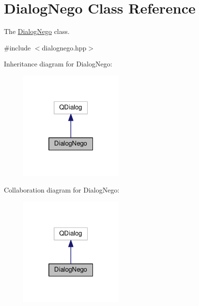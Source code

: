 \hypertarget{classDialogNego}{}\section{Dialog\+Nego Class Reference}
\label{classDialogNego}


The \hyperlink{classDialogNego}{Dialog\+Nego} class.  




{\ttfamily \#include $<$dialognego.\+hpp$>$}



Inheritance diagram for Dialog\+Nego\+:
\nopagebreak
\begin{figure}[H]
\begin{center}
\leavevmode
\includegraphics[width=148pt]{classDialogNego__inherit__graph}
\end{center}
\end{figure}


Collaboration diagram for Dialog\+Nego\+:
\nopagebreak
\begin{figure}[H]
\begin{center}
\leavevmode
\includegraphics[width=148pt]{classDialogNego__coll__graph}
\end{center}
\end{figure}
